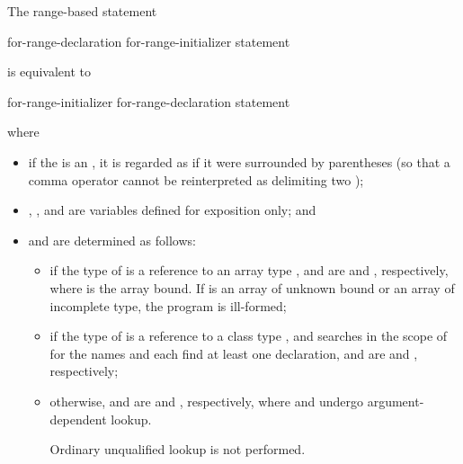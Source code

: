 \pnum
The range-based  statement
\begin{ncsimplebnf}
 \terminal{(}  for-range-declaration \terminal{:} for-range-initializer \terminal{)} statement
\end{ncsimplebnf}
is equivalent to
\begin{ncsimplebnf}
\terminal{\{}\br
\bnfindent {}\br
\bnfindent {} \terminal{\&\&} \terminal{=} for-range-initializer \terminal{;}\br
\bnfindent {}  \terminal{=}  \terminal{;}\br
\bnfindent {}  \terminal{=}  \terminal{;}\br
\bnfindent {} \terminal{(} \terminal{;}  \terminal{!=} \terminal{;} \terminal{++} \terminal{)} \terminal{\{}\br
\bnfindent\bnfindent for-range-declaration \terminal{=} \terminal{*}  \terminal{;}\br
\bnfindent\bnfindent statement\br
\bnfindent \terminal{\}}\br
\terminal{\}}
\end{ncsimplebnf}
where
\begin{itemize}
\item
if the  is an ,
it is regarded as if it were surrounded by parentheses (so that a comma operator
cannot be reinterpreted as delimiting two );

\item {}, , and  are variables defined for
exposition only; and

\item
{} and  are determined as follows:

\begin{itemize}
\item if the type of  is a reference to an
array type ,  and  are
 and  \tcode{+} , respectively,
where  is
the array bound. If  is an array of unknown bound or an array of
incomplete type, the program is ill-formed;

\item if the type of  is a reference to a
class type , and
searches in the scope of 
for the names  and 
each find at least one declaration,
 and  are
 and ,
respectively;

\item otherwise,  and  are
 and , respectively,
where  and  undergo
argument-dependent lookup.
\begin{note}
Ordinary unqualified lookup is not
performed.
\end{note}
\end{itemize}
\end{itemize}
